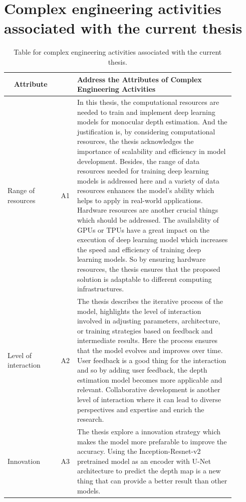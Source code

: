 \documentclass[a4paper,12pt,oneside]{book}
\begin{document}
\section{Complex engineering activities associated with the current thesis}
% 
\begin{table}[!htb]
\centering
\begin{threeparttable}
\captionsetup{font=small}
\caption{Table for complex engineering activities associated with the current thesis.}
\label{tab:test}
\small %

\begin{tabular}{|p{0.22\linewidth}|p{0.03\linewidth}|p{0.65\linewidth}|}
\hline
\multicolumn{1}{|c|}{\textbf{Attribute}} & {\textbf{ }} & {\textbf{Address the Attributes of Complex Engineering Activities
}} \\  
\hline
Range of resources & A1 &
In this thesis, the computational resources are needed to train and implement deep learning models for monocular depth estimation. And the justification is, by considering computational resources, the thesis acknowledges the importance of scalability and efficiency in model development. Besides, the range of data resources needed for training deep learning models is addressed here and a variety of data resources enhances the model's ability which helps to apply in real-world applications. Hardware resources are another crucial things which should be addressed. The availability of GPUs or TPUs have a great impact on the execution of deep learning model which increases the speed and efficiency of training deep learning models. So by ensuring  hardware resources, the thesis ensures that the proposed solution is adaptable to different computing infrastructures.\\ \hline

Level of interaction & A2 &

The thesis describes the iterative process of the model, highlights the level of interaction involved in adjusting parameters, architecture, or training strategies based on feedback and intermediate results. Here the process ensures that the model evolves and improves over time. User feedback is a good thing for the interaction and so by adding user feedback, the depth estimation model becomes more applicable and relevant. Collaborative development is another level of interaction where it can lead to diverse perspectives and expertise and enrich the research.
 \\ \hline

Innovation & A3 &
 The thesis explore a innovation strategy which makes the model more prefarable to improve the accuracy. Using the Inception-Resnet-v2 pretrained model as an encoder with U-Net architecture to predict the depth map is a new thing that can provide a better result than other models. \\ 
\hline


\end{tabular}
\end{threeparttable}
\end{table}
\end{document}
